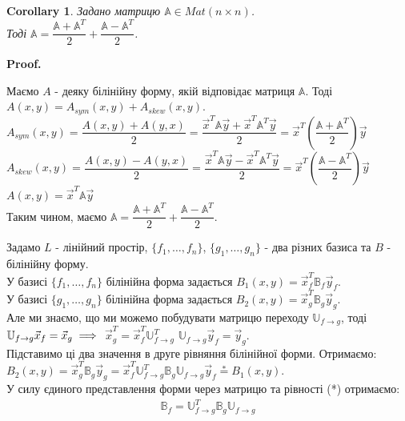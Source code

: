 \documentclass[a4paper, 10pt]{article}
\makeatletter
\theoremstyle{theoremdd}
\newtheorem{corollary}[theorem]{Corollary}
\renewenvironment{proof}[1][Proof.\\]{\par
\pushQED{\hfill \qed}%
\normalfont \topsep6\p@\@plus6\p@\relax
\trivlist
\item\relax
{\bfseries
#1\@addpunct{.}}\hspace\labelsep\ignorespaces
}{%
\popQED\endtrivlist\@endpefalse
}
\makeatother
\begin{document}
\begin{corollary}
Задано матрицю $\mathbb{A} \in Mat (n \times n)$.\\
Тоді $\mathbb{A} = \dfrac{\mathbb{A} + \mathbb{A}^T}{2} + \dfrac{\mathbb{A} - \mathbb{A}^T}{2}$.
\end{corollary}

\begin{proof}
Маємо $A$ - деяку білінійну форму, якій відповідає матриця $\mathbb{A}$. Тоді $A(x,y) = A_{sym}(x,y) + A_{skew}(x,y)$.\\
$A_{sym}(x,y) = \dfrac{A(x,y) + A(y,x)}{2} = \dfrac{\vec{x}^T \mathbb{A} \vec{y} + \vec{x}^T \mathbb{A}^T \vec{y}}{2} = \vec{x}^T \left( \dfrac{\mathbb{A} + \mathbb{A}^T}{2} \right) \vec{y}$\\
$A_{skew}(x,y) = \dfrac{A(x,y) - A(y,x)}{2} = \dfrac{\vec{x}^T \mathbb{A} \vec{y} - \vec{x}^T \mathbb{A}^T \vec{y}}{2} = \vec{x}^T \left( \dfrac{\mathbb{A} - \mathbb{A}^T}{2} \right) \vec{y}$\\
$A(x,y) = \vec{x}^T \mathbb{A} \vec{y}$\\
Таким чином, маємо $\mathbb{A} = \dfrac{\mathbb{A} + \mathbb{A}^T}{2} + \dfrac{\mathbb{A} - \mathbb{A}^T}{2}$.
\end{proof}

Задамо $L$ - лінійний простір, $\{f_1,\dots,f_n\}$, $\{g_1,\dots,g_n\}$ - два різних базиса та $B$ - білінійну форму.\\
У базисі $\{f_1,\dots,f_n\}$ білінійна форма задається $B_1(x,y) = \vec{x}^T_f \mathbb{B}_f \vec{y}_f$.\\
У базисі $\{g_1,\dots,g_n\}$ білінійна форма задається $B_2(x,y) = \vec{x}^T_g \mathbb{B}_g \vec{y}_g$.\\
Але ми знаємо, що ми можемо побудувати матрицю переходу $\mathbb{U}_{f \to g}$, тоді $\mathbb{U}_{f \to g} \vec{x}_f = \vec{x}_g \implies \\ $ 
$\vec{x}_g^T = \vec{x}_f^T \mathbb{U}_{f \to g}^T$ \hspace{1cm} $\mathbb{U}_{f \to g} \vec{y}_f = \vec{y}_g$.\\
Підставимо ці два значення в друге рівняння білінійної форми. Отримаємо:\\
$B_2(x,y) = \vec{x}_g^T \mathbb{B}_g \vec{y}_g = \vec{x}_f^T \mathbb{U}^T_{f \to g} \mathbb{B}_g \mathbb{U}_{f \to g} \vec{y}_f \overset{*}{=} B_1(x,y)$.\\
У силу єдиного представлення форми через матрицю та рівності (*) отримаємо:
\begin{align*}
\mathbb{B}_f = \mathbb{U}^T_{f \to g} \mathbb{B}_g \mathbb{U}_{f \to g}
\end{align*}
\end{document}

